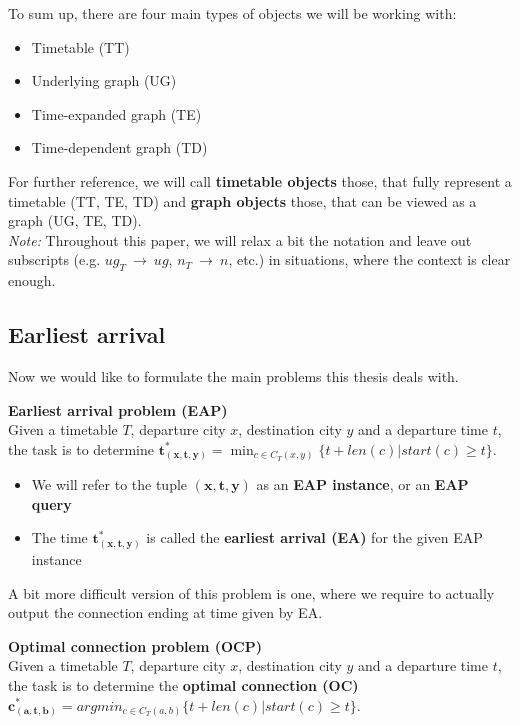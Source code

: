 	\noindent To sum up, there are four main types of objects we will be working with:
	\begin{itemize}
		\item Timetable (TT)
		\item Underlying graph (UG)
		\item Time-expanded graph (TE)
		\item Time-dependent graph (TD)
	\end{itemize}
	\hspace*{\fill}
	
	
	\noindent For further reference, we will call \textbf{timetable objects} those, that fully represent a timetable (TT, TE, TD) and \textbf{graph objects} those, that can be viewed as a graph (UG, TE, TD). \\
	
	\noindent \textit{Note:} Throughout this paper, we will relax a bit the notation and leave out subscripts (e.g. $ug_{T}~\rightarrow~ug$, $n_{T}~\rightarrow~n$, etc.) in situations, where the context is clear enough. 

\subsection{Earliest arrival}

	Now we would like to formulate the main problems this thesis deals with.
	
	\begin{definition}
		\textbf{Earliest arrival problem (EAP)}\\
        Given a timetable $T$, departure city $x$, destination city $y$ and a departure time $t$, the task is to determine $\bm{t_{(x, t, y)}^{*}} = \min_{c \in C_{T}(x, y)} \{t + len(c)|start(c) \geq t\}$. 
        \begin{itemize}
        	\item We will refer to the tuple $\bm{(x, t, y)}$ as an \textbf{EAP instance}, or an \textbf{EAP query}
        	\item The time $\bm{t_{(x, t, y)}^{*}}$ is called the \textbf{earliest arrival (EA)} for the given EAP instance
        \end{itemize}
	\end{definition}
	
	\noindent A bit more difficult version of this problem is one, where we require to actually output the connection ending at time given by EA.

	\begin{definition}
		\textbf{Optimal connection problem (OCP)}\\
        Given a timetable $T$, departure city $x$, destination city $y$ and a departure time $t$, the task is to determine the \textbf{optimal connection (OC)} $\bm{c_{(a, t, b)}^{*}} = argmin_{c \in C_{T}(a, b)} \{t + len(c)|start(c) \geq t\}$. 
	\end{definition}
	
